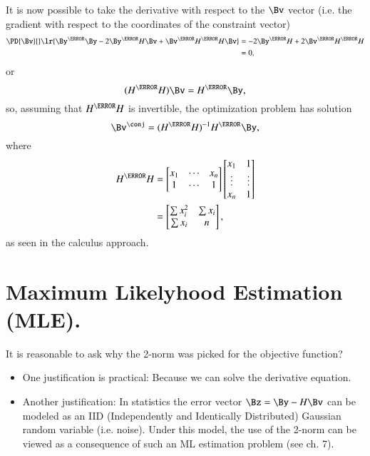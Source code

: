 It is now possible to take the derivative with respect to the \( \Bv \) vector (i.e. the gradient with respect to the coordinates of the constraint vector)
\begin{equation}\label{eqn:L1introduction:280}
\begin{aligned}
\PD{\Bv}{}
\lr{ \By^\T \By - 2 \By^\T H \Bv + \Bv^\T H^\T H \Bv }
&= - 2 \By^\T H + 2 \Bv^\T H^\T H \\
&= 0,
\end{aligned}
\end{equation}
or
\begin{equation}\label{eqn:L1introduction:300}
(H^\T H) \Bv = H^\T \By,
\end{equation}
so, assuming that \( H^\T H \) is invertible, the optimization problem has solution
\begin{equation}\label{eqn:L1introduction:320}
\Bv^\conj = (H^\T H)^{-1} H^\T \By,
\end{equation}
where
\begin{equation}\label{eqn:L1introduction:340}
\begin{aligned}
H^\T H
&=
\begin{bmatrix}
x_1 & \cdots & x_n \\
 1  & \cdots & 1   \\
\end{bmatrix}
\begin{bmatrix}
x_1 & 1 \\
\vdots & \vdots \\
x_n & 1
\end{bmatrix} \\
&=
\begin{bmatrix}
\sum x_i^2 & \sum x_i \\
\sum x_i & n
\end{bmatrix}
,
\end{aligned}
\end{equation}
as seen in the calculus approach.
\section{Maximum Likelyhood Estimation (MLE).}
It is reasonable to ask why the 2-norm was picked for the objective function?
\begin{itemize}
\item One justification is practical: Because we can solve the derivative equation.
\item Another justification: In statistics the error vector \( \Bz = \By - H \Bv \) can be modeled as an IID (Independently and Identically Distributed) Gaussian random variable (i.e. noise).  Under this model, the use of the 2-norm can be viewed as a consequence of such an ML estimation problem (see \citep{boyd2004convex} ch. 7).
\end{itemize}

